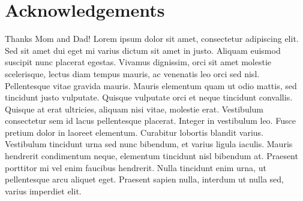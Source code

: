\section*{Acknowledgements}

\normalsize            
Thanks Mom and Dad! Lorem ipsum dolor sit amet, consectetur adipiscing elit. Sed sit amet dui eget mi varius dictum sit amet in justo. Aliquam euismod suscipit nunc placerat egestas. Vivamus dignissim, orci sit amet molestie scelerisque, lectus diam tempus mauris, ac venenatis leo orci sed nisl. Pellentesque vitae gravida mauris. Mauris elementum quam ut odio mattis, sed tincidunt justo vulputate. Quisque vulputate orci et neque tincidunt convallis. Quisque at erat ultricies, aliquam nisi vitae, molestie erat. Vestibulum consectetur sem id lacus pellentesque placerat. Integer in vestibulum leo. Fusce pretium dolor in laoreet elementum. Curabitur lobortis blandit varius. Vestibulum tincidunt urna sed nunc bibendum, et varius ligula iaculis. Mauris hendrerit condimentum neque, elementum tincidunt nisl bibendum at. Praesent porttitor mi vel enim faucibus hendrerit. Nulla tincidunt enim urna, ut pellentesque arcu aliquet eget. Praesent sapien nulla, interdum ut nulla sed, varius imperdiet elit.

\newpage

